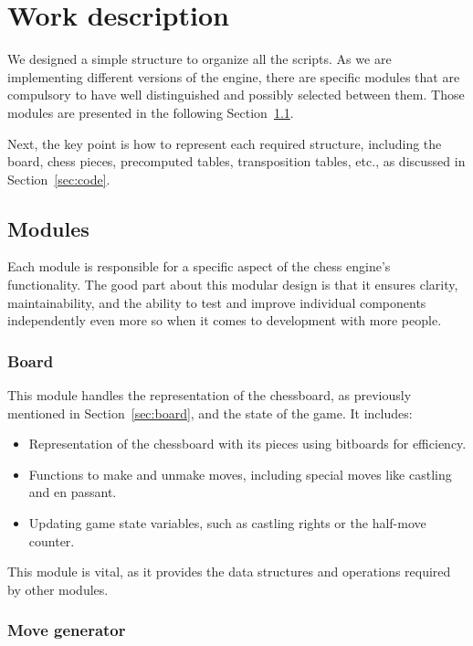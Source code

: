 \chapter{Work description}
\label{cap:descripcionTrabajo}

We designed a simple structure to organize all the scripts. As we are implementing different versions of the engine, there are specific modules that are compulsory to have well distinguished and possibly selected between them. Those modules are presented in the following Section~\ref{sec:modules}.

\vspace{1em}

\noindent Next, the key point is how to represent each required structure, including the board, chess pieces, precomputed tables, transposition tables, etc., as discussed in Section~\ref{sec:code}.

\section{Modules}
\label{sec:modules}

Each module is responsible for a specific aspect of the chess engine's functionality. The good part about this modular design is that it ensures clarity, maintainability, and the ability to test and improve individual components independently even more so when it comes to development with more people.

\subsection{Board}

\noindent This module handles the representation of the chessboard, as previously mentioned in Section~\ref{sec:board}, and the state of the game. It includes:
\begin{itemize}
    \item Representation of the chessboard with its pieces using bitboards for efficiency.
    \item Functions to make and unmake moves, including special moves like castling and en passant.
    \item Updating game state variables, such as castling rights or the half-move counter.
\end{itemize}

\noindent This module is vital, as it provides the data structures and operations required by other modules.

\subsection{Move generator}


